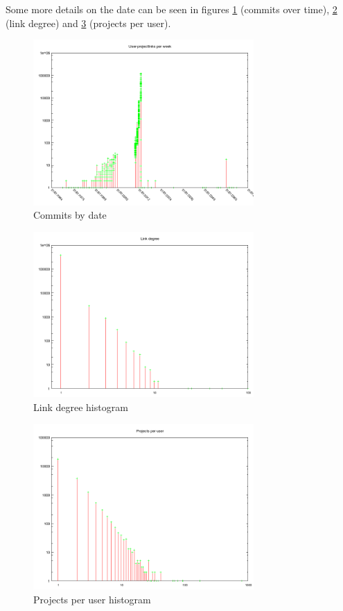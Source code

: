 \documentclass[10pt,a4paper]{article}
\begin{document}
Some more details on the date can be seen in figures \ref{fig:user-project-links-per-week} (commits over time), \ref{fig:link-degree-hist} (link degree) and \ref{fig:projects-per-user-hist} (projects per user).

\begin{figure}[htb]
    \centering
    \includegraphics[width=0.75\textwidth]{user-project-links-per-week}
    \caption{Commits by date}
    \label{fig:user-project-links-per-week}
\end{figure}

\begin{figure}[htb]
    \centering
    \includegraphics[width=0.75\textwidth]{link-degree-histogram}
    \caption{Link degree histogram}
    \label{fig:link-degree-hist}
\end{figure}

\begin{figure}[htb]
    \centering
    \includegraphics[width=0.75\textwidth]{projects-per-user-histogram}
    \caption{Projects per user histogram}
    \label{fig:projects-per-user-hist}
\end{figure}
\end{document}
